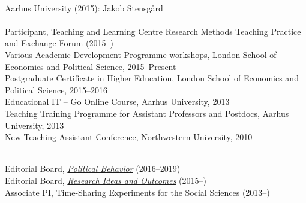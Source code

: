 \documentclass[12pt]{article}
\renewcommand{\section}[1]{\pagebreak[3]%
    \llap{\scshape\smash{\parbox[t]{\marginparwidth}{\raggedright {\color{lg}#1}}}}%
    \vspace{-\baselineskip}\par}
\newcommand{\topic}[1]{\pagebreak[3]\indent {\color{lg}{\footnotesize #1 }}\\}
\newcommand{\entry}[1]{\indent {\color{lg}\guillemotright}\hspace{2pt}#1\vspace{.25em}\\}
\begin{document}
\topic{Master Thesis Supervision}
	\entry{Aarhus University (2015): Jakob Stensg{\aa}rd}

\topic{Pedagogical Training}
	\entry{Participant, Teaching and Learning Centre Research Methods Teaching Practice and Exchange Forum (2015--)}
	\entry{Various Academic Development Programme workshops, London School of Economics and Political Science, 2015--Present}
	\entry{Postgraduate Certificate in Higher Education, London School of Economics and Political Science, 2015--2016}
	\entry{Educational IT -- Go Online Course, Aarhus University, 2013}
	\entry{Teaching Training Programme for Assistant Professors and Postdocs, Aarhus University, 2013}
	\entry{New Teaching Assistant Conference, Northwestern University, 2010}

\section{Editing \&\\ Reviewing}
\topic{Editing}
	\entry{Editorial Board, \href{http://link.springer.com/journal/11109}{\textit{Political Behavior}} (2016--2019)}
	\entry{Editorial Board, \href{http://riojournal.com/}{\textit{Research Ideas and Outcomes}} (2015--)}
	\entry{Associate PI, Time-Sharing Experiments for the Social Sciences (2013--)}
\end{document}
